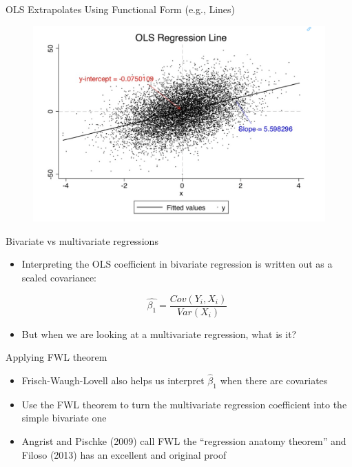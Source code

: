 \documentclass{beamer}
\begin{document}
\begin{frame}{OLS Extrapolates Using Functional Form (e.g., Lines)}

\begin{figure}[!t]\centering
\includegraphics[scale=0.4]{./lecture_includes/ols_line}
\end{figure}

\end{frame}

\begin{frame}{Bivariate vs multivariate regressions}

\begin{itemize}

\item Interpreting the OLS coefficient in bivariate regression is written out as a scaled covariance:

 $$\widehat{\beta_1}=\frac{Cov(Y_i,X_i)}{Var(X_i)}$$
 
 \item But when we are looking at a multivariate regression, what is it?
 
 \end{itemize}
 
 \end{frame}
 
 \begin{frame}{Applying FWL theorem}

\begin{itemize}
\item Frisch-Waugh-Lovell also helps us interpret $\widehat{\beta}_1$ when there are covariates
 \item Use the FWL theorem to turn the multivariate regression coefficient into the simple bivariate one
\item Angrist and Pischke (2009) call FWL the ``regression anatomy theorem'' and Filoso (2013) has an excellent and original proof
\end{itemize}

\end{frame}
\end{document}
